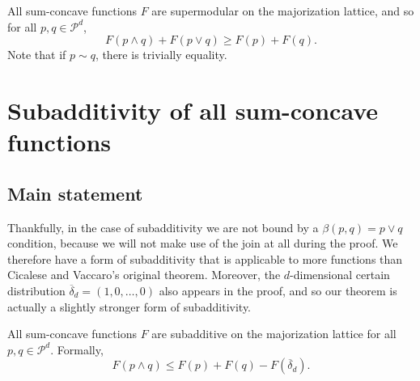 \begin{conjecture} \label{conj:alternative_supermodularity}
    All sum-concave functions $F$ are supermodular on the majorization lattice, and so for all $p, q \in \mathcal{P}^d$,
    \begin{equation}
        F(p \wedge q) + F(p \vee q) \geq F(p) + F(q).
    \end{equation}
    Note that if $p \sim q$, there is trivially equality.
\end{conjecture}



\section{Subadditivity of all sum-concave functions} \label{sec:alternative_subadditivity}

\subsection{Main statement}

Thankfully, in the case of subadditivity we are not bound by a $\beta(p, q) = p \vee q$ condition, because we will not make use of the join at all during the proof. We therefore have a form of subadditivity that is applicable to more functions than Cicalese and Vaccaro's original theorem. Moreover, the $d$-dimensional certain distribution $\overline{\delta}_d = (1, 0, \dots, 0)$ also appears in the proof, and so our theorem is actually a slightly stronger form of subadditivity.

\begin{theorem} \label{th:alternative_subadditivity}
    All sum-concave functions $F$ are subadditive on the majorization lattice for all $p, q \in \mathcal{P}^d$. Formally,
    \begin{equation} \label{eq:subadditivity}
        F(p \wedge q) \leq F(p) + F(q) - F(\overline{\delta}_d).
    \end{equation}
\end{theorem}


